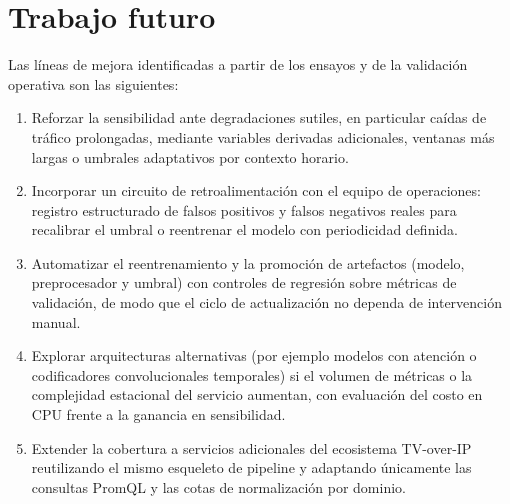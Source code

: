 \section{Trabajo futuro}

Las líneas de mejora identificadas a partir de los ensayos y de la validación operativa son las siguientes:

\begin{enumerate}
\item Reforzar la sensibilidad ante degradaciones sutiles, en particular caídas de tráfico prolongadas, mediante variables derivadas adicionales, ventanas más largas o umbrales adaptativos por contexto horario.
\item Incorporar un circuito de retroalimentación con el equipo de operaciones: registro estructurado de falsos positivos y falsos negativos reales para recalibrar el umbral o reentrenar el modelo con periodicidad definida.
\item Automatizar el reentrenamiento y la promoción de artefactos (modelo, preprocesador y umbral) con controles de regresión sobre métricas de validación, de modo que el ciclo de actualización no dependa de intervención manual.
\item Explorar arquitecturas alternativas (por ejemplo modelos con atención o codificadores convolucionales temporales) si el volumen de métricas o la complejidad estacional del servicio aumentan, con evaluación del costo en CPU frente a la ganancia en sensibilidad.
\item Extender la cobertura a servicios adicionales del ecosistema TV-over-IP reutilizando el mismo esqueleto de pipeline y adaptando únicamente las consultas PromQL y las cotas de normalización por dominio.
\end{enumerate}
